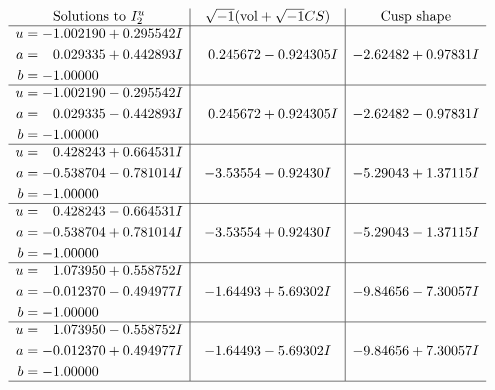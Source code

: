 \documentclass[1p]{elsarticle_modified}
\theoremstyle{definition}
\newcommand{\I}{\sqrt{-1}}
\begin{document}
$$\begin{array}{c|c|c}  
\text{Solutions to }I^u_{2}& \I (\text{vol} + \sqrt{-1}CS) & \text{Cusp shape}\\
 \hline 
\begin{aligned}
u &= -1.002190 + 0.295542 I \\
a &= \phantom{-}0.029335 + 0.442893 I \\
b &= -1.00000\phantom{ +0.000000I}\end{aligned}
 & \phantom{-}0.245672 - 0.924305 I & -2.62482 + 0.97831 I \\ \hline\begin{aligned}
u &= -1.002190 - 0.295542 I \\
a &= \phantom{-}0.029335 - 0.442893 I \\
b &= -1.00000\phantom{ +0.000000I}\end{aligned}
 & \phantom{-}0.245672 + 0.924305 I & -2.62482 - 0.97831 I \\ \hline\begin{aligned}
u &= \phantom{-}0.428243 + 0.664531 I \\
a &= -0.538704 - 0.781014 I \\
b &= -1.00000\phantom{ +0.000000I}\end{aligned}
 & -3.53554 - 0.92430 I & -5.29043 + 1.37115 I \\ \hline\begin{aligned}
u &= \phantom{-}0.428243 - 0.664531 I \\
a &= -0.538704 + 0.781014 I \\
b &= -1.00000\phantom{ +0.000000I}\end{aligned}
 & -3.53554 + 0.92430 I & -5.29043 - 1.37115 I \\ \hline\begin{aligned}
u &= \phantom{-}1.073950 + 0.558752 I \\
a &= -0.012370 - 0.494977 I \\
b &= -1.00000\phantom{ +0.000000I}\end{aligned}
 & -1.64493 + 5.69302 I & -9.84656 - 7.30057 I \\ \hline\begin{aligned}
u &= \phantom{-}1.073950 - 0.558752 I \\
a &= -0.012370 + 0.494977 I \\
b &= -1.00000\phantom{ +0.000000I}\end{aligned}
 & -1.64493 - 5.69302 I & -9.84656 + 7.30057 I\\
 \hline 
 \end{array}$$\newpage
\end{document}

